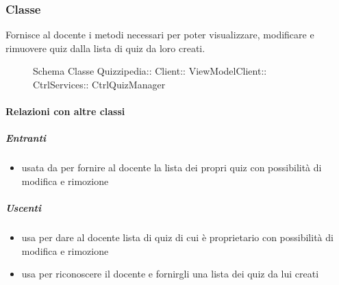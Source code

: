 \subsubsection{Classe }
Fornisce al docente i metodi necessari per poter visualizzare, modificare e rimuovere quiz dalla lista di quiz da loro creati.
\begin{figure}[H]
\centering
\noindent{}
\caption[Schema Classe CtrlQuizManager]{Schema Classe Quizzipedia:: Client:: ViewModelClient:: CtrlServices:: CtrlQuizManager}
\end{figure}
\paragraph{Relazioni con altre classi}
\subparagraph{Entranti}
\begin{itemize}
\item usata da  per fornire al docente la lista dei propri quiz con possibilità di modifica e rimozione
\end{itemize}
\subparagraph{Uscenti}
\begin{itemize}
\item usa  per dare al docente lista di quiz di cui è proprietario con possibilità di modifica e rimozione
\item usa  per riconoscere il docente e fornirgli una lista dei quiz da lui creati
\end{itemize}
